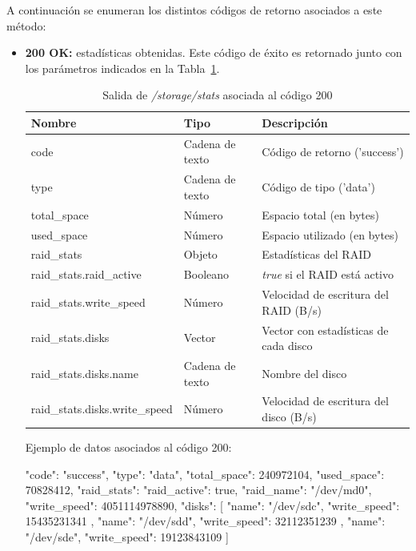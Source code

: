 A continuación se enumeran los distintos códigos de retorno asociados a este método:
\begin{itemize}

\item{\textbf{200 OK:} estadísticas obtenidas.
Este código de éxito es retornado junto con los parámetros indicados en la Tabla~\ref{extra:api:storagestats:ok}.
\begin{table}[H]
\centering
\begin{tabular}{|l|l|l|}
\hline
\rowcolor[HTML]{F5F5F5}
\textbf{Nombre}                & \textbf{Tipo}   & \textbf{Descripción}                        \\ \hline
code                           & Cadena de texto & Código de retorno ('success')               \\ \hline
type                           & Cadena de texto & Código de tipo ('data')                     \\ \hline
total\_space                   & Número          & Espacio total (en bytes)                    \\ \hline
used\_space                    & Número          & Espacio utilizado (en bytes)                \\ \hline
raid\_stats                    & Objeto          & Estadísticas del \gls{RAID}                 \\ \hline
raid\_stats.raid\_active       & Booleano        & \textit{true} si el \gls{RAID} está activo  \\ \hline
raid\_stats.write\_speed       & Número          & Velocidad de escritura del \gls{RAID} (B/s) \\ \hline
raid\_stats.disks              & Vector          & Vector con estadísticas de cada disco       \\ \hline
raid\_stats.disks.name         & Cadena de texto & Nombre del disco                            \\ \hline
raid\_stats.disks.write\_speed & Número          & Velocidad de escritura del disco (B/s)      \\ \hline
\end{tabular}
\caption{Salida de \textit{/storage/stats} asociada al código 200}
\label{extra:api:storagestats:ok}
\end{table}
\begin{minipage}{\textwidth}
Ejemplo de datos asociados al código 200:

\begin{code}[language=json]
{
  "code": "success",
  "type": "data",
  "total_space": 240972104,
  "used_space": 70828412,
  "raid_stats": {
    "raid_active": true,
    "raid_name": "/dev/md0",
    "write_speed": 4051114978890,
    "disks": [
      {
        "name": "/dev/sdc",
        "write_speed": 15435231341
      },
      {
        "name": "/dev/sdd",
        "write_speed": 32112351239
      },
      {
        "name": "/dev/sde",
        "write_speed": 19123843109
      }
    ]
  }
}
\end{code}
\end{minipage}
}

\end{itemize}


